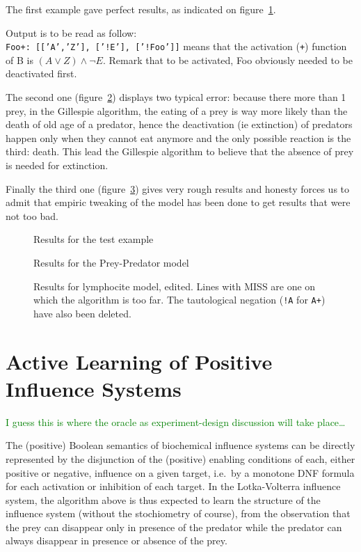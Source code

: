 \documentclass{llncs}
\newcommand{\sylvain}[1]{\textcolor{green}{#1}}
\begin{document}
The first example gave perfect results, as indicated on figure~\ref{test_res}.

Output is to be read as follow:\\
\texttt{Foo+:~[['A','Z'],~['!E'],~['!Foo']]} means that the activation (\texttt{+}) function of B is $(A \vee Z)\wedge\neg E$. Remark that to be activated, Foo obviously needed to be deactivated first.

The second one (figure~\ref{preypred_res}) displays two typical error: because there more than 1 prey, in the Gillespie algorithm, the eating of a prey is way more likely than the death of old age of a predator, hence the deactivation (ie extinction) of predators happen only when they cannot eat anymore and the only possible reaction is the third: death. This lead the Gillespie algorithm to believe that the absence of prey is needed for extinction.

Finally the third one (figure~\ref{lympho_res}) gives very rough results and honesty forces us to admit that empiric tweaking of the model has been done to get results that were not too bad.

\begin{figure}
	
	\caption{Results for the test example\label{test_res}}
\end{figure}
\begin{figure}
	
	\caption{Results for the Prey-Predator model\label{preypred_res}}
\end{figure}
\begin{figure}
	
	\caption{Results for lymphocite model, edited. Lines with MISS are one on which the algorithm is too far. The tautological negation (\texttt{!A} for \texttt{A+}) have also been deleted.\label{lympho_res}}
\end{figure}


\section{Active Learning of Positive Influence Systems}
\label{sec:oracles}

\sylvain{I guess this is where the oracle as experiment-design discussion will
take place\dots}

The (positive) Boolean semantics of biochemical influence systems
can be directly represented by the disjunction of the (positive) enabling conditions of each, either positive or negative, influence on a given target,
i.e.~by a monotone DNF formula for each activation or inhibition of each target.
In the Lotka-Volterra influence system, the algorithm above is thus expected to learn the structure of the influence system
(without the stochiometry of course),
from the observation that the prey can disappear only in presence of the predator
while the predator can always disappear in presence or absence of the prey.
\end{document}
